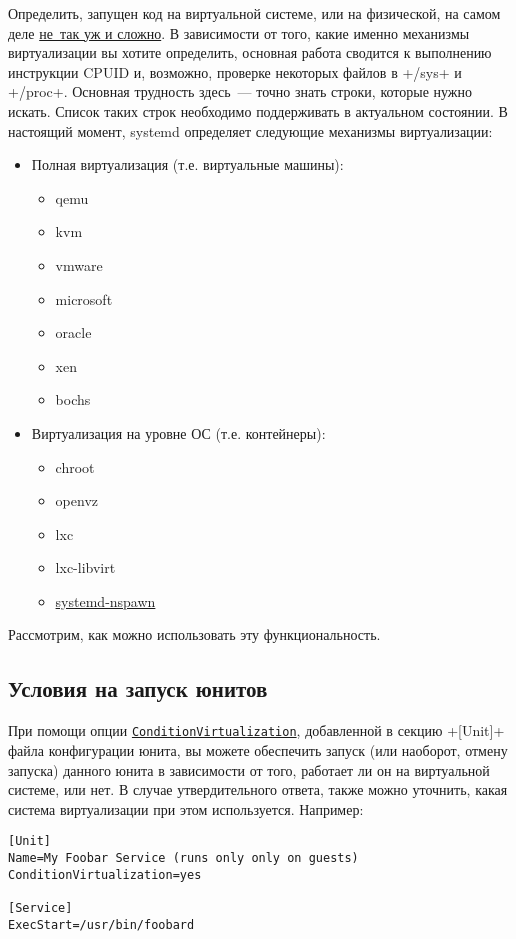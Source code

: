\documentclass[10pt,oneside,a4paper]{article}
\newcommand{\hreftt}[2]{\href{#1}{\texttt{#2}}}
\begin{document}
Определить, запущен код на виртуальной системе, или на физической, на самом деле
\href{http://cgit.freedesktop.org/systemd/systemd/tree/src/shared/virt.c#n30}{не~так
уж и сложно}. В зависимости от того, какие именно механизмы виртуализации вы
хотите определить, основная работа сводится к выполнению инструкции CPUID и,
возможно, проверке некоторых файлов в +/sys+ и +/proc+. Основная трудность
здесь~--- точно знать строки, которые нужно искать. Список таких строк
необходимо поддерживать в актуальном состоянии. В настоящий момент, systemd
определяет следующие механизмы виртуализации:
\begin{itemize}
	\item Полная виртуализация (т.е. виртуальные машины):
		\begin{itemize}
			\item qemu
			\item kvm
			\item vmware
			\item microsoft
			\item oracle
			\item xen
			\item bochs
		\end{itemize}
	\item Виртуализация на уровне ОС (т.е. контейнеры):
		\begin{itemize}
			\item chroot
			\item openvz
			\item lxc
			\item lxc-libvirt
			\item \hyperref[sec:chroots]{systemd-nspawn}
		\end{itemize}
\end{itemize}

Рассмотрим, как можно использовать эту функциональность.

\subsection{Условия на запуск юнитов}

При помощи опции
\hreftt{http://www.freedesktop.org/software/systemd/man/systemd.unit.html}{ConditionVirtualization},
добавленной в секцию +[Unit]+ файла конфигурации юнита, вы можете обеспечить
запуск (или наоборот, отмену запуска) данного юнита в зависимости от того,
работает ли он на виртуальной системе, или нет. В случае утвердительного ответа,
также можно уточнить, какая система виртуализации при этом используется.
Например:
\begin{Verbatim}
[Unit]
Name=My Foobar Service (runs only only on guests)
ConditionVirtualization=yes

[Service]
ExecStart=/usr/bin/foobard
\end{Verbatim}
\end{document}
